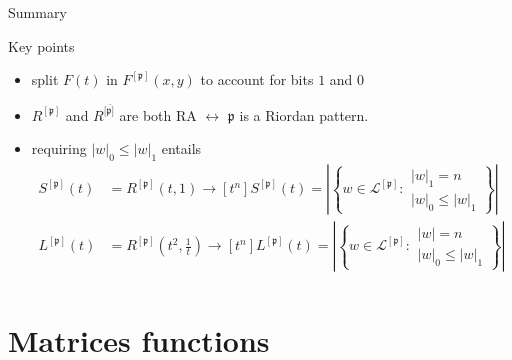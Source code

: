 \documentclass{beamer}
\begin{document}
\begin{frame}{Summary}

  \begin{block}{Key points}
      \begin{itemize}
      \item split $F(t)$ in $F^{[\mathfrak{p}]}(x,y)$ to account for bits $1$ and $0$
      \item ${{R}^{[\mathfrak{p}]}}$ and ${{R}^{[\bar{\mathfrak{p}]}}}$ are both RA
      $\leftrightarrow$  $\mathfrak{p}$ is a Riordan pattern.
      \item requiring $|w|_{0}\leq|w|_{1}$ entails
          \begin{displaymath}
          \begin{split}
          S^{[\mathfrak{p}]}(t)&=R^{[\mathfrak{p}]}(t,1)\rightarrow 
            [t^{n}]S^{[\mathfrak{p}]}(t)= \left|\left\lbrace w \in  \mathcal{L}^{[\mathfrak{p}]}:
                \begin{array}{l} |w|_{1} = n \\ |w|_{0}\leq|w|_{1} \end{array}\right\rbrace\right|\\
          L^{[\mathfrak{p}]}(t)&=R^{[\mathfrak{p}]}\left(t^2,\frac{1}{t}\right)\rightarrow
            [t^{n}]L^{[\mathfrak{p}]}(t)= \left|\left\lbrace w \in  \mathcal{L}^{[\mathfrak{p}]}:
                \begin{array}{l} |w| = n \\ |w|_{0}\leq|w|_{1} \end{array}\right\rbrace\right|\\
          \end{split}
          \end{displaymath}
      \end{itemize}
  \end{block}
\end{frame}

\section{Matrices functions}
\end{document}
